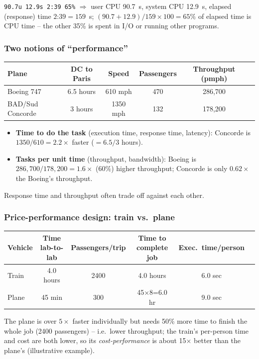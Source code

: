 \begin{eg}
\texttt{90.7u 12.9s 2:39 65\%} $\Rightarrow$ user CPU 90.7~s, system CPU
12.9~s, elapsed (response) time $2$:$39 = 159$~s; $(90.7+12.9)/159 \times
100 = 65\%$ of elapsed time is CPU time -- the other 35\% is spent in I/O or
running other programs.
\end{eg}

\subsubsection{Two notions of ``performance''}
\begin{eg}
\leavevmode
\begin{center}
\begin{tabular}{@{}lccccc@{}}
\toprule
Plane & DC to Paris & Speed & Passengers & Throughput (pmph) \\
\midrule
Boeing 747      & 6.5 hours & 610 mph  & 470 & 286,700 \\
BAD/Sud Concorde & 3 hours  & 1350 mph & 132 & 178,200 \\
\bottomrule
\end{tabular}
\end{center}
\begin{itemize}
  \item \textbf{Time to do the task} (execution time, response time,
  latency): Concorde is $1350/610 = 2.2\times$ faster ($=6.5/3$ hours).
  \item \textbf{Tasks per unit time} (throughput, bandwidth): Boeing is
  $286{,}700/178{,}200 = 1.6\times$ ($60\%$) higher throughput; Concorde is
  only $0.62\times$ the Boeing's throughput.
\end{itemize}
\end{eg}
\begin{remark}
Response time and throughput often trade off against each other.
\end{remark}

\subsubsection{Price-performance design: train vs.\ plane}
\begin{eg}
\leavevmode
\begin{center}
\begin{tabular}{@{}lccccc@{}}
\toprule
Vehicle & Time lab-to-lab & Passengers/trip & Time to complete job &
Exec.\ time/person \\
\midrule
Train & 4.0 hours & 2400 & 4.0 hours    & 6.0 sec \\
Plane & 45 min    & 300  & 45$\times$8=6.0 hr & 9.0 sec \\
\bottomrule
\end{tabular}
\end{center}
The plane is over $5\times$ faster individually but needs 50\% more time to
finish the whole job (2400 passengers) -- i.e.\ lower throughput; the
train's per-person time and cost are both lower, so its \emph{cost-performance}
is about 15$\times$ better than the plane's (illustrative example).
\end{eg}

